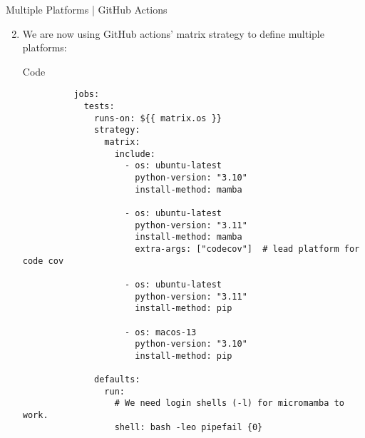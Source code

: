 \begin{frame}[fragile]{
    Multiple Platforms | GitHub Actions
    \hfill
  }
  \begin{enumerate}
    \setcounter{enumi}{1}
    \item We are now using GitHub actions' matrix strategy to define multiple platforms:
      \begin{block}{Code}
        \footnotesize
        \begin{verbatim}
          jobs:
            tests:
              runs-on: ${{ matrix.os }}
              strategy:
                matrix:
                  include:
                    - os: ubuntu-latest
                      python-version: "3.10"
                      install-method: mamba

                    - os: ubuntu-latest
                      python-version: "3.11"
                      install-method: mamba
                      extra-args: ["codecov"]  # lead platform for code cov

                    - os: ubuntu-latest
                      python-version: "3.11"
                      install-method: pip

                    - os: macos-13
                      python-version: "3.10"
                      install-method: pip

              defaults:
                run:
                  # We need login shells (-l) for micromamba to work.
                  shell: bash -leo pipefail {0}
        \end{verbatim}
      \end{block}
  \end{enumerate}
\end{frame}

